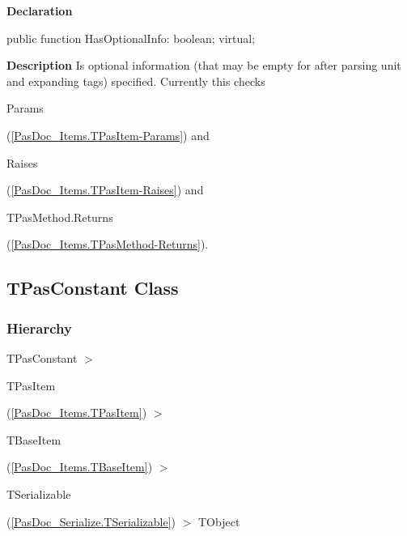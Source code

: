 \documentclass{report}
\newif\ifpdf
\begin{document}
\label{PasDoc_Items.TPasItem-HasOptionalInfo}
\begin{list}{}{
\setlength{\itemindent}{0cm}
\setlength{\listparindent}{0cm}
\setlength{\leftmargin}{\evensidemargin}
\addtolength{\leftmargin}{\tmplength}
\settowidth{\labelsep}{X}
\addtolength{\leftmargin}{\labelsep}
\setlength{\labelwidth}{\tmplength}
}
\item[\textbf{Declaration}\hfill]
\ifpdf
\begin{flushleft}
\fi
\begin{ttfamily}
public function HasOptionalInfo: boolean; virtual;\end{ttfamily}

\ifpdf
\end{flushleft}
\fi

\par
\item[\textbf{Description}]
Is optional information (that may be empty for after parsing unit and expanding tags) specified. Currently this checks \begin{ttfamily}Params\end{ttfamily}(\ref{PasDoc_Items.TPasItem-Params}) and \begin{ttfamily}Raises\end{ttfamily}(\ref{PasDoc_Items.TPasItem-Raises}) and \begin{ttfamily}TPasMethod.Returns\end{ttfamily}(\ref{PasDoc_Items.TPasMethod-Returns}).

\end{list}
\ifpdf
\subsection*{\large{\textbf{TPasConstant Class}}\normalsize\hspace{1ex}\hrulefill}
\else
\subsection*{TPasConstant Class}
\fi
\label{PasDoc_Items.TPasConstant}
\subsubsection*{\large{\textbf{Hierarchy}}\normalsize\hspace{1ex}\hfill}
TPasConstant {$>$} \begin{ttfamily}TPasItem\end{ttfamily}(\ref{PasDoc_Items.TPasItem}) {$>$} \begin{ttfamily}TBaseItem\end{ttfamily}(\ref{PasDoc_Items.TBaseItem}) {$>$} \begin{ttfamily}TSerializable\end{ttfamily}(\ref{PasDoc_Serialize.TSerializable}) {$>$} 
TObject
\end{document}
